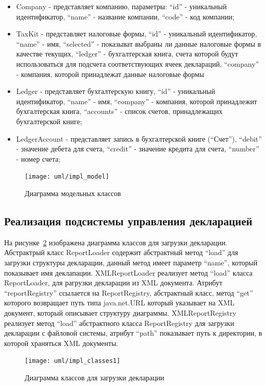 \documentclass[14pt,a4paper]{reportmod}
\begin{document}
\begin{itemize}
  \item Company - представляет компанию, параметры: ``id'' - уникальный идентификатор, ``name'' - название компании, ``code'' - код компании;
  \item TaxKit - представляет налоговые формы, ``id'' - уникальный идентификатор, ``name'' - имя, ``selected'' - показыват выбраны ли данные налоговые формы в качестве текущих, ``ledger'' - бухгалтерская книга, счета которой будут использоваться для подсчета соответствующих ячеек деклараций, ``company'' - компания, которой принадлежат данные налоговые формы
  \item Ledger - представляет бухгалтерскую книгу, ``id'' - уникальный идентификатор, ``name'' - имя, ``company'' - компания, которой принадлежит бухгалтерская книга, ``accounts'' - список счетов, принадлежащих бухгалтерской книге;
  \item LedgerAccount - представляет запись в бухгалтерской книге (``Счет''), ``debit'' - значение дебета для счета, ``credit'' - значение кредита для счета, ``number'' - номер счета;
\end{itemize}

\begin{figure}
  \centering
  \texttt{[image: uml/impl\_model]}
  \caption{Диаграмма модельных классов}
  \label{pic:model_classes}
\end{figure}

\subsection{Реализация подсистемы управления декларацией}

На рисунке~\ref{pic:loadclasses} изображена диаграмма классов для загрузки декларации. Абстрактрый класс ReportLoader содержит абстрактный метод ``load'' для загрузки структуры декларации, данный метод имеет параметр ``name'', который показывает имя деклапации. XMLReportLoader реализует метод ``load'' класса ReportLoader, для рагрузки декларации из XML документа. Атрибут ``reportRegistry'' ссылается на ReportRegistry, абстрактный класс, метод ``get'' которого возвращает путь типа java.net.URL который указывает на XML документ, который описывает структуру диаграммы.  XMLReportRegistry реализует метод ``load'' абстрактного класса ReportRegistry для загрузки декларации с файловой системы, атрибут ``path'' показывает путь к директории, в которой храняться XML документы.

\begin{figure}
  \centering
  \texttt{[image: uml/impl\_classes1]}
  \caption{Диаграмма классов для загрузки декларации}
  \label{pic:loadclasses}
\end{figure}
\end{document}
